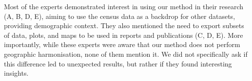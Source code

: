Most of the experts demonstrated interest in using our method in their research
(A, B, D, E), aiming to use the census data as a backdrop for other datasets,
providing demographic context. They also mentioned the need to export subsets of
data, plots, and maps to be used in reports and publications (C, D, E). More
importantly, while these experts were aware that our method does not perform
geographic harmonisation, none of them mention it. We did not specifically ask
if this difference led to unexpected results, but rather if they found
interesting insights. 

